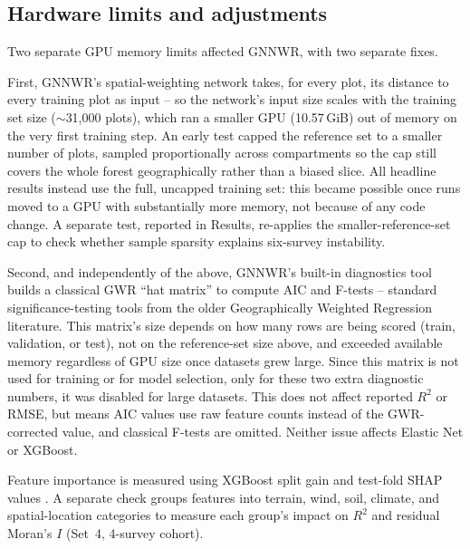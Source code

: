 \documentclass[logo,msc,ai]{infthesis}           %
\begin{document}
\subsection*{Hardware limits and adjustments}
Two separate GPU memory limits affected GNNWR, with two separate fixes. %

First, GNNWR's spatial-weighting network takes, for every plot, its distance to every training plot as input -- so the network's input size scales with the training set size ($\sim$31,000 plots), which ran a smaller GPU (10.57\,GiB) out of memory on the very first training step. An early test capped the reference set to a smaller number of plots, sampled proportionally across compartments so the cap still covers the whole forest geographically rather than a biased slice. All headline results instead use the full, uncapped training set: this became possible once runs moved to a GPU with substantially more memory, not because of any code change. A separate test, reported in Results, re-applies the smaller-reference-set cap to check whether sample sparsity explains six-survey instability.

Second, and independently of the above, GNNWR's built-in diagnostics tool builds a classical GWR ``hat matrix'' to compute AIC and F-tests -- standard significance-testing tools from the older Geographically Weighted Regression literature. This matrix's size depends on how many rows are being scored (train, validation, or test), not on the reference-set size above, and exceeded available memory regardless of GPU size once datasets grew large. Since this matrix is not used for training or for model selection, only for these two extra diagnostic numbers, it was disabled for large datasets. This does not affect reported $R^2$ or RMSE, but means AIC values use raw feature counts instead of the GWR-corrected value, and classical F-tests are omitted. Neither issue affects Elastic Net or XGBoost.

Feature importance is measured using XGBoost split gain and test-fold SHAP values %
. A separate check groups features into terrain, wind, soil, climate, and spatial-location categories to measure each group's impact on $R^2$ and residual Moran's $I$ (Set~4, 4-survey cohort).
\end{document}
